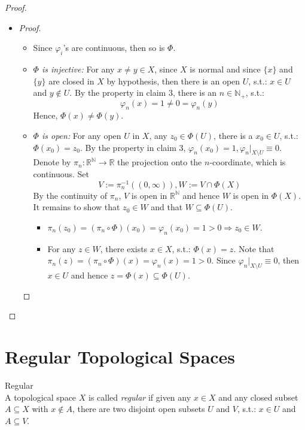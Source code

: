 \begin{proof}
\begin{itemize}
\begin{itemize}
            \item \begin{proof}
                \begin{itemize}
                    \item Since $\varphi_i$'s are continuous, then so is $\Phi$.
                    \item \textit{$\Phi$ is injective:} For any $x \neq y \in X$, since $X$ is normal and since $\{x\}$ and $\{y\}$ are closed in $X$ by hypothesis, then there is an open $U$, s.t.: $x \in U$ and $y \notin U$. By the property in claim 3, there is an $n \in \mathbb{N}_+$, s.t.:
                    $$\varphi_n(x)=1 \neq 0= \varphi _n(y)$$
                    Hence, $\Phi(x) \neq \Phi(y)$.
                    \item \textit{$\Phi$ is open:} For any open $U$ in $X$, any $z_0 \in \Phi(U)$, there is a $x_0 \in U$, s.t.: $\Phi(x_0)=z_0$. By the property in claim 3, $\varphi_n (x_0)=1, \varphi_n |_{X\setminus U} \equiv 0$. Denote by $\pi_n: \mathbb{R}^\mathbb{N} \to \mathbb{R}$ the projection onto the $n$-coordinate, which is continuous. Set
                    $$V:= \pi_n^{-1}((0,\infty)), W:= V \cap \Phi(X)$$
                    By the continuity of $\pi_n$, $V$ is open in $\mathbb{R}^\mathbb{N}$ and hence $W$ is open in $\Phi(X)$. It remains to show that $z_0 \in W$ and that $W \subseteq \Phi(U)$.
                    \begin{itemize}
                        \item $\pi_n(z_0) =(\pi_n \circ \Phi) (x_0) =\varphi_n(x_0) =1>0 \Rightarrow z_0 \in W$.
                        \item For any $z \in W$, there exists $x \in X$, s.t.: $\Phi(x) =z$. Note that $\pi_n (z) =(\pi_n \circ \Phi) (x) =\varphi_n(x) =1>0$. Since $\varphi_n|_{X \setminus U} \equiv 0$, then $x \in U$ and hence $z = \Phi(x) \subseteq \Phi(U)$.
                    \end{itemize}
                \end{itemize}
            \end{proof}
        \end{itemize}
    \end{itemize}
\end{proof}

\section{Regular Topological Spaces}

\begin{definition}{Regular}\\
A topological space $X$ is called \textit{regular} if given any $x \in X$ and any closed subset $A \subseteq X$ with $x \notin A$, there are two disjoint open subsets $U$ and $V$, s.t.: $x \in U$ and $A \subseteq V$.
\end{definition}

